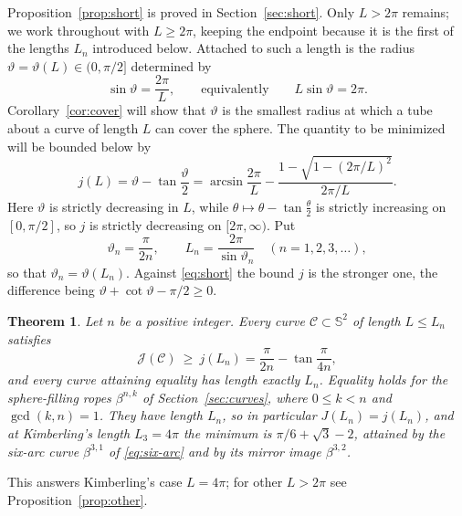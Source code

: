 \documentclass[11pt,oneside,reqno]{amsart}
\theoremstyle{plain}
\newtheorem{theorem}{Theorem}
\theoremstyle{definition}
\newcommand{\Sph}{\mathbb{S}^{2}}
\newcommand{\bta}[2]{\beta^{#1,#2}}
\begin{document}
Proposition~\ref{prop:short} is proved in Section~\ref{sec:short}.
Only $L>2\pi$ remains; we work throughout with $L\ge2\pi$, keeping the endpoint
because it is the first of the lengths $L_{n}$ introduced below. Attached to such
a length is the radius
$\vartheta=\vartheta(L)\in(0,\pi/2]$ determined by
\begin{equation}\label{eq:vartheta}
  \sin\vartheta=\frac{2\pi}{L},\qquad\text{equivalently}\qquad
  L\sin\vartheta=2\pi .
\end{equation}
Corollary~\ref{cor:cover} will show that $\vartheta$ is the smallest radius at
which a tube about a curve of length $L$ can cover the sphere.
The quantity to be minimized will be bounded below by
\begin{equation}\label{eq:j}
  j(L)=\vartheta-\tan\frac{\vartheta}{2}
  =\arcsin\frac{2\pi}{L}-\frac{1-\sqrt{1-(2\pi/L)^{2}}}{2\pi/L} .
\end{equation}
Here $\vartheta$ is strictly decreasing in $L$, while
$\theta\mapsto\theta-\tan\frac{\theta}{2}$ is strictly increasing on $[0,\pi/2]$,
so $j$ is strictly decreasing on $[2\pi,\infty)$. Put
\[
  \vartheta_{n}=\frac{\pi}{2n},\qquad L_{n}=\frac{2\pi}{\sin\vartheta_{n}}
  \quad(n=1,2,3,\dots),
\]
so that $\vartheta_{n}=\vartheta(L_{n})$. Against \eqref{eq:short} the bound $j$
is the stronger one, the difference being
$\vartheta+\cot\vartheta-\pi/2\ge0$.

\begin{theorem}\label{thm:main}
Let $n$ be a positive integer. Every curve $\mathcal{C}\subset\Sph$ of length
$L\le L_{n}$ satisfies
\begin{equation}\label{eq:main}
  \mathcal{J}(\mathcal{C})\ \ge\ j(L_{n})=\frac{\pi}{2n}-\tan\frac{\pi}{4n},
\end{equation}
and every curve attaining equality has length exactly $L_{n}$. Equality holds
for the sphere-filling ropes $\bta{n}{k}$ of Section~\ref{sec:curves}, where
$0\le k<n$ and $\gcd(k,n)=1$. They have length $L_{n}$, so in particular
$J(L_{n})=j(L_{n})$, and at Kimberling's length $L_{3}=4\pi$ the minimum
is $\pi/6+\sqrt{3}-2$, attained by the six-arc curve $\bta{3}{1}$ of
\eqref{eq:six-arc} and by its mirror image $\bta{3}{2}$.
\end{theorem}

This answers Kimberling's case $L=4\pi$; for other $L>2\pi$ see
Proposition~\ref{prop:other}.
\end{document}
